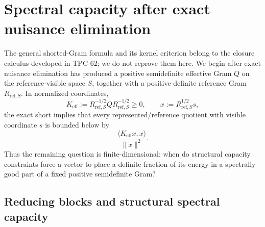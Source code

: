 \section{Spectral capacity after exact nuisance elimination}
\label{sec:tpc65-spectral-capacity}

The general shorted-Gram formula and its kernel criterion belong to the
closure calculus developed in TPC-62; we do not reprove them here.  We begin
after exact nuisance elimination has produced a positive semidefinite
effective Gram \(Q\) on the reference-visible space \(S\), together with a
positive definite reference Gram \(R_{\mathrm{ref},S}\).  In normalized
coordinates,
\begin{equation}
  K_{\mathrm{eff}}
  :=
  R_{\mathrm{ref},S}^{-1/2}
  Q
  R_{\mathrm{ref},S}^{-1/2}
  \ge 0,
  \qquad
  x:=R_{\mathrm{ref},S}^{1/2}s,
  \label{eq:tpc65-effective-gram}
\end{equation}
the exact short implies that every represented/reference quotient with
visible coordinate \(s\) is bounded below by
\begin{equation}
  \frac{\langle K_{\mathrm{eff}}x,x\rangle}{\|x\|^2}.
  \label{eq:tpc65-effective-rayleigh}
\end{equation}
Thus the remaining question is finite-dimensional: when do structural
capacity constraints force a vector to place a definite fraction of its
energy in a spectrally good part of a fixed positive semidefinite Gram?

\subsection{Reducing blocks and structural spectral capacity}

